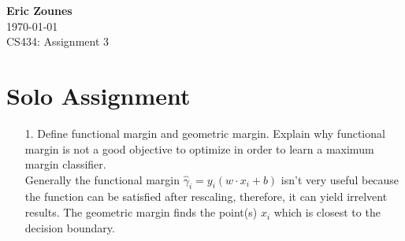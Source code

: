 \documentclass[12pt,letterpaper]{article}
\begin{document}
\setcounter{subsection}{2} 
\begin{flushright}
\end{flushright}
\begin{flushleft}
\textbf{Eric Zounes} \\
\today \\ 
CS434: Assignment 3
\end{flushleft}
\section[2]{Solo Assignment} 
\begin{enumerate} 
	\item[1.] Define functional margin and geometric margin. Explain why functional margin is not a good objective to optimize in order to learn a maximum margin classifier. \\
	Generally the functional margin $\hat{\gamma}_{i} = y_{i}(w\cdot x_{i} + b)$ isn't very useful because the function can be satisfied after rescaling, therefore, it can yield irrelvent results. The geometric margin finds the point(s) $x_{i}$ which is closest to the decision boundary. 


\end{enumerate}
\end{document}
